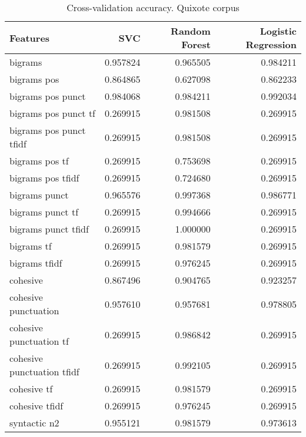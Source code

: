 \documentclass{article}
\begin{document}
\begin{table}
\centering
\caption{Cross-validation accuracy. Quixote corpus}
\begin{tabular}{lrrr}
\toprule
{Features} &       SVC &  Random Forest &  Logistic Regression \\
\midrule
bigrams                    &  0.957824 &       0.965505 &             0.984211 \\
bigrams pos                &  0.864865 &       0.627098 &             0.862233 \\
bigrams pos punct          &  0.984068 &       0.984211 &             0.992034 \\
bigrams pos punct tf       &  0.269915 &       0.981508 &             0.269915 \\
bigrams pos punct tfidf    &  0.269915 &       0.981508 &             0.269915 \\
bigrams pos tf             &  0.269915 &       0.753698 &             0.269915 \\
bigrams pos tfidf          &  0.269915 &       0.724680 &             0.269915 \\
bigrams punct              &  0.965576 &       0.997368 &             0.986771 \\
bigrams punct tf           &  0.269915 &       0.994666 &             0.269915 \\
bigrams punct tfidf        &  0.269915 &       1.000000 &             0.269915 \\
bigrams tf                 &  0.269915 &       0.981579 &             0.269915 \\
bigrams tfidf              &  0.269915 &       0.976245 &             0.269915 \\
cohesive                   &  0.867496 &       0.904765 &             0.923257 \\
cohesive punctuation       &  0.957610 &       0.957681 &             0.978805 \\
cohesive punctuation tf    &  0.269915 &       0.986842 &             0.269915 \\
cohesive punctuation tfidf &  0.269915 &       0.992105 &             0.269915 \\
cohesive tf                &  0.269915 &       0.981579 &             0.269915 \\
cohesive tfidf             &  0.269915 &       0.976245 &             0.269915 \\
syntactic n2               &  0.955121 &       0.981579 &             0.973613 \\

\end{tabular}
\end{table}
\end{document}
